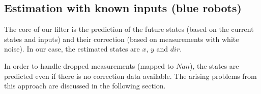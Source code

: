 \subsection{Estimation with known inputs (blue robots)}
The core of our filter is the prediction of the future states (based on the current states and inputs) and their correction (based on measurements with white noise). In our case, the estimated states are \(x\), \(y\) and \(dir\).


\parskip 20pt

In order to handle dropped measurements (mapped to \(Nan\)), the states are predicted even if there is no correction data available. The arising problems from this approach are discussed in the following section.


\parskip 10pt

